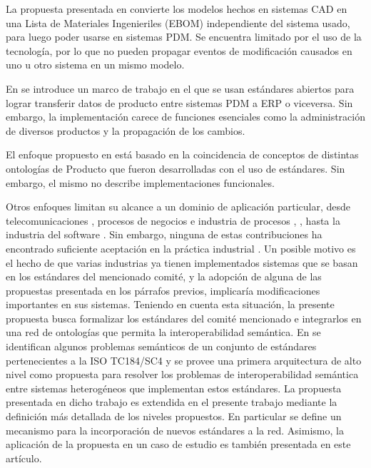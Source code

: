 \documentclass[journal]{IEEEtran}
\begin{document}
La propuesta presentada en \cite{Paviot2011b} convierte los modelos hechos en sistemas CAD en una Lista de Materiales Ingenieriles (EBOM) independiente del sistema usado, para luego poder usarse en sistemas PDM. Se encuentra limitado por el uso de la tecnolog\'ia, por lo que no pueden propagar eventos de modificaci\'on causados en uno u otro sistema en un mismo modelo. 

En \cite{Paviot2011h} se introduce un marco de trabajo en el que se usan est\'andares abiertos para lograr transferir datos de producto entre sistemas PDM a ERP o viceversa. Sin embargo, la implementaci\'on carece de funciones esenciales como la administraci\'on de diversos productos y la propagaci\'on de los cambios. 

El enfoque propuesto en \cite{Tursi2009} est\'a basado en la coincidencia de conceptos de distintas ontolog\'ias de Producto que fueron desarrolladas con el uso de est\'andares. Sin embargo, el mismo no describe implementaciones funcionales.

Otros enfoques limitan su alcance a un dominio de aplicaci\'on particular, desde telecomunicaciones \cite{Duke2004}, procesos de negocios \cite{Silega2014} e industria de procesos \cite{JonAtleGulla}, \cite{Marquardt2010}, hasta la industria del software \cite{Isotani2015}. Sin embargo, ninguna de estas contribuciones ha encontrado suficiente aceptaci\'on en la pr\'actica industrial \cite{Wiesner2011}.  Un posible motivo es el hecho de que varias industrias ya tienen implementados sistemas que se basan en los est\'andares del mencionado comit\'e, y la adopci\'on de alguna de las propuestas presentada en los p\'arrafos previos, implicar\'ia modificaciones importantes en sus sistemas.  Teniendo en cuenta esta situaci\'on, la presente propuesta busca formalizar los est\'andares del comit\'e mencionado e integrarlos en una red de ontolog\'ias que permita la interoperabilidad sem\'antica. En \cite{Fraga} se identifican algunos problemas sem\'anticos de un conjunto de est\'andares pertenecientes a la ISO TC184/SC4 y se provee una primera arquitectura de alto nivel como propuesta para resolver los problemas de interoperabilidad sem\'antica entre sistemas heterog\'eneos que implementan estos est\'andares. La propuesta presentada en dicho trabajo es extendida en el presente trabajo mediante la definici\'on m\'as detallada de los niveles propuestos. En particular se define un mecanismo para la incorporaci\'on de nuevos est\'andares a la red. Asimismo, la aplicaci\'on de la propuesta en un caso de estudio es tambi\'en presentada en este art\'iculo.
\end{document}
